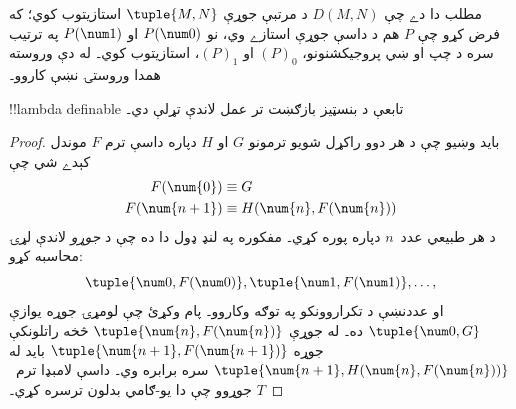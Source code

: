 \documentclass[../../../include/open-logic-section]{subfiles}
\begin{document}
مطلب دا دے چې $D(M,N)$ د مرتبې جوړې $\tuple{M, N}$ استازيتوب کوي؛
که فرض کړو چې $P$ هم د داسې جوړې استازے وي، نو $P(\num 0)$ او
$P(\num 1)$ په ترتيب سره د چپ او ښي پروجيکشنونو، $(P)_0$ او
$(P)_1$، استازيتوب کوي۔ له دې وروسته همدا وروستۍ نښې کاروو۔

\begin{lem}
!!{lambda definable} تابعې د بنسټيز بازګښت تر عمل لاندې تړلې دي۔
\end{lem}

\begin{proof}
بايد وښيو چې د هر دوو راکړل شويو ترمونو $G$ او $H$ دپاره داسې ترم
$F$ موندل کېدے شي چې
\begin{align*}
F(\num{0}) & \equiv G \\
F(\num{n+1}) & \equiv H(\num{n}, F(\num{n}))
\end{align*}
د هر طبيعي عدد~$n$ دپاره پوره کړي۔ مفکوره په لنډ ډول دا ده چې
د \emph{جوړو} لاندې لړۍ محاسبه کړو:
\[
\tuple{\num 0, F(\num 0)}, \tuple{\num 1, F(\num 1)}, \dots,
\]
او عددنښې د تکراروونکو په توګه وکاروو۔ پام وکړئ چې لومړۍ جوړه
يوازې $\tuple{\num 0, G}$ ده۔ له جوړې $\tuple{\num{n},
F(\num{n})}$ څخه راتلونکې جوړه $\tuple{\num{n+1}, F(\num{n+1})}$
بايد له $\tuple{\num{n+1}, H(\num{n}, F(\num{n}))}$ سره برابره وي۔
داسې لامبډا ترم~$T$ جوړوو چې دا يو-ګامي بدلون ترسره کړي۔


\end{proof}
\end{document}
